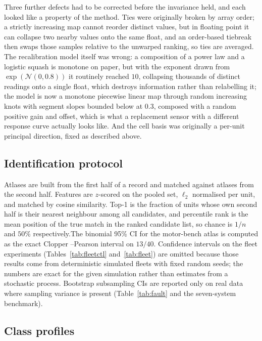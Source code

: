 \documentclass[11pt]{article}
\begin{document}
Three further defects had to be corrected before the invariance held, and each
looked like a property of the method. Ties were originally broken by array
order; a strictly increasing map cannot reorder distinct values, but in
floating point it can collapse two nearby values onto the same float, and an
order-based tiebreak then swaps those samples relative to the unwarped
ranking, so ties are averaged. The recalibration model itself was wrong: a
composition of a power law and a logistic squash is monotone on paper, but
with the exponent drawn from $\exp(\mathcal{N}(0, 0.8))$ it routinely reached
$10$, collapsing thousands of distinct readings onto a single float, which
destroys information rather than relabelling it; the model is now a monotone
piecewise linear map through random increasing knots with segment slopes
bounded below at $0.3$, composed with a random positive gain and offset, which
is what a replacement sensor with a different response curve actually looks
like. And the cell basis was originally a per-unit principal direction, fixed
as described above.

\subsection{Identification protocol}

Atlases are built from the first half of a record and matched against atlases
from the second half. Features are $z$-scored on the pooled set, $\ell_2$
normalised per unit, and matched by cosine similarity. Top-1 is the fraction
of units whose own second half is their nearest neighbour among all
candidates, and percentile rank is the mean position of the true match in the
ranked candidate list, so chance is $1/n$ and $50\%$ respectively.The binomial 95\% CI for the motor-bench atlas is computed as the exact Clopper
--Pearson interval on $13/40$. Confidence intervals on the fleet experiments
(Tables~\ref{tab:fleetctl} and~\ref{tab:fleet}) are omitted because those
results come from deterministic simulated fleets with fixed random seeds;
the numbers are exact for the given simulation rather than estimates from a
stochastic process. Bootstrap subsampling CIs are reported only on real
data where sampling variance is present (Table~\ref{tab:fault} and the
seven-system benchmark).

\subsection{Class profiles}
\end{document}
